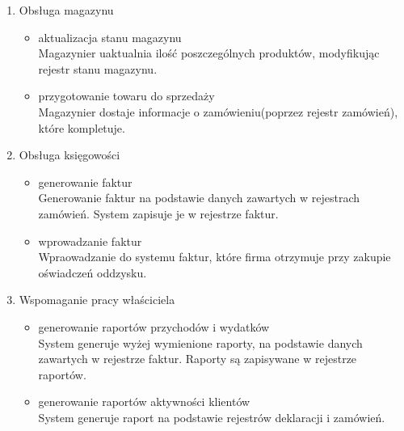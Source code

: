 \begin{enumerate}
	\item Obsługa magazynu
		\begin{itemize}
			\item aktualizacja stanu magazynu \\
		 	Magazynier uaktualnia ilość poszczególnych produktów, modyfikując rejestr stanu magazynu.
		 	\item przygotowanie towaru do sprzedaży \\
		 	Magazynier dostaje informacje o zamówieniu(poprzez rejestr zamówień), które kompletuje.
		\end{itemize}

	\item Obsługa księgowości
		\begin{itemize}
			\item generowanie faktur \\ 
			Generowanie faktur na podstawie danych zawartych w rejestrach zamówień. System zapisuje je w rejestrze faktur.
			\item wprowadzanie faktur \\
			Wpraowadzanie do systemu faktur, które firma otrzymuje przy zakupie oświadczeń oddzysku.
		\end{itemize}

	\item Wspomaganie pracy właściciela
		\begin{itemize}
			\item generowanie raportów przychodów i wydatków\\
			System generuje wyżej wymienione raporty, na podstawie danych zawartych w rejestrze faktur. Raporty są zapisywane w rejestrze raportów.
			\item generowanie raportów aktywności klientów \\
			System generuje raport na podstawie rejestrów deklaracji i zamówień.
		\end{itemize}

\end{enumerate}